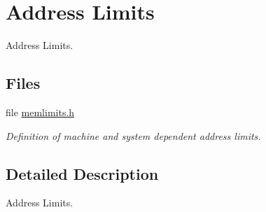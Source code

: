 \hypertarget{group__mips__limits}{}\section{Address Limits}
\label{group__mips__limits}


Address Limits.  


\subsection*{Files}
\begin{DoxyCompactItemize}
\item 
file \mbox{\hyperlink{memlimits_8h}{memlimits.\+h}}
\begin{DoxyCompactList}\small\item\em Definition of machine and system dependent address limits. \end{DoxyCompactList}\end{DoxyCompactItemize}


\subsection{Detailed Description}
Address Limits. 

